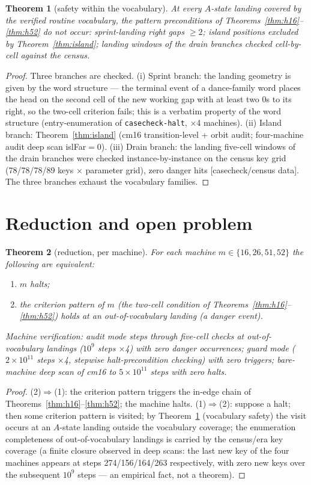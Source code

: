 \documentclass[11pt]{amsart}
\newtheorem{theorem}{Theorem}[section]
\begin{document}
\begin{theorem}[safety within the vocabulary]\label{thm:vocab}
At every $A$-state landing covered by the verified routine vocabulary, the pattern preconditions of Theorems~\ref{thm:h16}--\ref{thm:h52} do not occur: sprint-landing right gaps $\ge2$; island positions excluded by Theorem~\ref{thm:island}; landing windows of the drain branches checked cell-by-cell against the census.
\end{theorem}
\begin{proof}
Three branches are checked. (i) Sprint branch: the landing geometry is given by the word structure --- the terminal event of a dance-family word places the head on the second cell of the new working gap with at least two $0$s to its right, so the two-cell criterion fails; this is a verbatim property of the word structure (entry-enumeration of \texttt{casecheck-halt}, $\times$4 machines). (ii) Island branch: Theorem~\ref{thm:island} (cm16 transition-level + orbit audit; four-machine audit deep scan islFar$=0$). (iii) Drain branch: the landing five-cell windows of the drain branches were checked instance-by-instance on the census key grid (78/78/78/89 keys $\times$ parameter grid), zero danger hits [casecheck/census data]. The three branches exhaust the vocabulary families.
\end{proof}

\section{Reduction and open problem}

\begin{theorem}[reduction, per machine]\label{thm:reduction}
For each machine $m\in\{16,26,51,52\}$ the following are equivalent:
\begin{enumerate}
\item $m$ halts;
\item the criterion pattern of $m$ (the two-cell condition of Theorems~\ref{thm:h16}--\ref{thm:h52}) holds at an \emph{out-of-vocabulary} landing (a danger event).
\end{enumerate}
Machine verification: audit mode steps through five-cell checks at out-of-vocabulary landings ($10^9$ steps $\times$4) with zero danger occurrences; guard mode ($2\times10^{11}$ steps $\times$4, stepwise halt-precondition checking) with zero triggers; bare-machine deep scan of cm16 to $5\times10^{11}$ steps with zero halts.
\end{theorem}
\begin{proof}
(2)$\Rightarrow$(1): the criterion pattern triggers the in-edge chain of Theorems~\ref{thm:h16}--\ref{thm:h52}; the machine halts. (1)$\Rightarrow$(2): suppose a halt; then some criterion pattern is visited; by Theorem~\ref{thm:vocab} (vocabulary safety) the visit occurs at an $A$-state landing outside the vocabulary coverage; the enumeration completeness of out-of-vocabulary landings is carried by the census/era key coverage (a finite closure observed in deep scans: the last new key of the four machines appears at steps 274/156/164/263 respectively, with zero new keys over the subsequent $10^9$ steps --- an empirical fact, not a theorem).
\end{proof}
\end{document}
